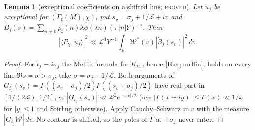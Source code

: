 \documentclass[10pt,reqno]{amsart}
\newtheorem{lemma}[theorem]{Lemma}
\theoremstyle{definition}
\numberwithin{equation}{section}
\newcommand{\R}{\mathbb R}
\newcommand{\cL}{\mathcal L}
\newcommand{\status}[1]{\textup{\textsc{#1}}}
\begin{document}
\begin{lemma}[exceptional coefficients on a shifted line; \status{proved}]\label{E:shift}
Let $u_j$ be exceptional for $(\Gamma_0(M),\chi)$, put
$s_v=\sigma_j+1/\cL+iv$ and
$\widetilde B_j(s)=\sum_{n\ne0}\overline{\rho_j(n)}\lambda\widehat\phi(\lambda n)
(\pi|n|Y)^{-s}$. Then
\[
 |\langle P_\chi,u_j\rangle|^2\ll\cL^4Y^{-1}
 \int_\R\mathcal W^*(v)|\widetilde B_j(s_v)|^2\,dv .
\]
\end{lemma}
\begin{proof}
For $t_j=i\sigma_j$ the Mellin formula for $K_{it_j}$, hence
\eqref{B:eq:mellin}, holds on every line $\Re s=\sigma>\sigma_j$; take
$\sigma=\sigma_j+1/\cL$. Both arguments of
$G_{t_j}(s_v)=\Gamma((s_v-\sigma_j)/2)\Gamma((s_v+\sigma_j)/2)$ have real part
in $[1/(2\cL),1/2]$, so $|G_{t_j}(s_v)|\ll\cL^2e^{-\pi|v|/2}$
(use $|\Gamma(x+iy)|\le\Gamma(x)\ll1/x$ for $|y|\le1$ and Stirling otherwise).
Apply Cauchy--Schwarz in $v$ with the measure $|G_{t_j}\mathcal W|\,dv$.
No contour is shifted, so the poles of $\Gamma$ at $\pm\sigma_j$ never enter.
\end{proof}
\end{document}

